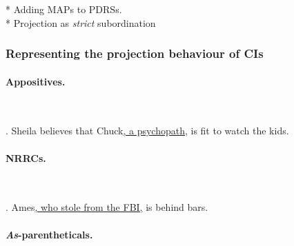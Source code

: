 * Adding MAPs to PDRSs. \\
* Projection as \textit{strict} subordination

\subsubsection{Representing the projection behaviour of CIs}

\paragraph{Appositives.}~

\noindent \parbox[b]{\textwidth}{
\ex. Sheila believes that Chuck\underline{, a psychopath,} is fit to watch
the kids.\\

}

\paragraph{NRRCs.}~

\noindent\parbox[b]{\textwidth}{
\ex. Ames\underline{, who stole from the FBI,} is behind bars.\\

}

\paragraph{\textit{As}-parentheticals.}~

